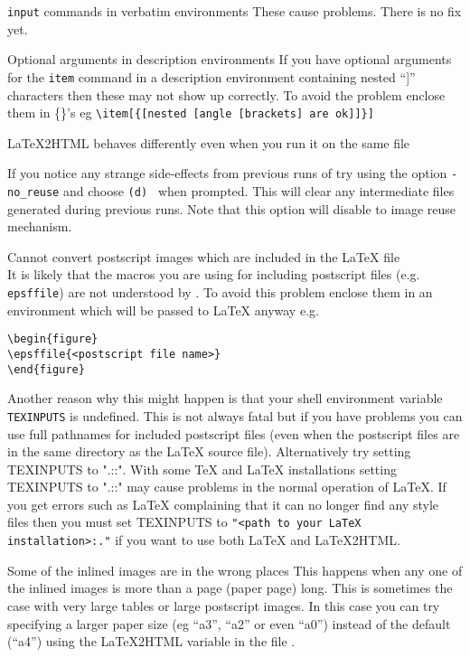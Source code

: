 \begin{htmllist}
\item [\texttt{input} commands in verbatim environments]
These cause problems. There is no fix yet.

\item [Optional arguments in description environments]
If you have optional arguments for the \texttt{item} command in 
a description environment containing nested ``]'' characters then 
these may not show up correctly. To avoid the problem enclose them
in \{\}'s eg \verb+\item[{[nested [angle [brackets] are ok]]}]+

\item [LaTeX2HTML behaves differently even when you run it on the
same file]

If you notice any strange side-effects from previous runs of
\latextohtml{} try using the option \texttt{-no\_reuse} and choose 
\texttt{(d) } when prompted. This will 
clear any intermediate files generated during previous runs.
Note that this option will disable to image reuse mechanism.

\item [Cannot convert postscript images which are included
in the LaTeX file] \hfill \\
It is likely that the macros you are using for including postscript
files (e.g. \texttt{epsffile}) are not understood by \latextohtml.
To avoid this problem enclose them in an environment which will
be passed to LaTeX anyway e.g.
\begin{verbatim}
\begin{figure}
\epsffile{<postscript file name>}
\end{figure}
\end{verbatim}

Another reason why this might happen is that your shell 
environment variable 
\texttt{TEXINPUTS} is undefined. This is not always 
fatal but if you have problems you can use full
pathnames for included postscript files (even when the postscript
files are in the same directory as the LaTeX source file).
Alternatively try setting TEXINPUTS to ".::". 
With some TeX and LaTeX installations setting TEXINPUTS to 
".::" may cause problems in the normal operation of LaTeX.
If you get errors such as LaTeX complaining that it can no longer find
any style files then you must set TEXINPUTS to 
\verb|"<path to your LaTeX installation>:."|
if you want to use both LaTeX and LaTeX2HTML.

\item [Some of the inlined images are in the wrong places]
This happens when any one of the inlined images is more than a page
(paper page) long. This is sometimes the case with very large tables
or large postscript images. In this case you can try specifying 
a larger paper size (eg ``a3'', ``a2'' or even ``a0'') instead of
the default (``a4'') using the LaTeX2HTML variable  
in the file .


\end{htmllist}
